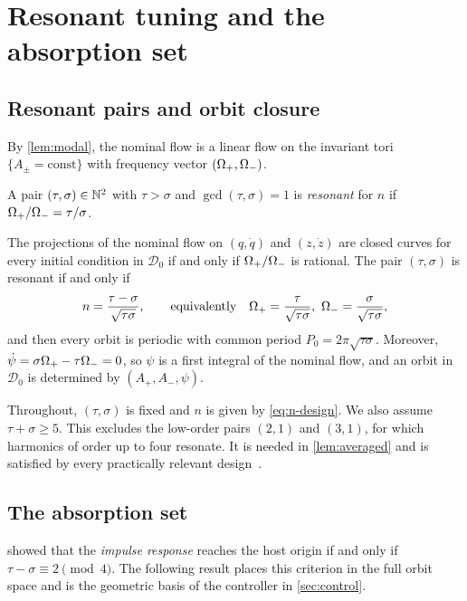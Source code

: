 \section{Resonant tuning and the absorption set}\label{sec:tuning}

\subsection{Resonant pairs and orbit closure}
By \cref{lem:modal}, the nominal flow is a linear flow on the invariant tori
$\{A_\pm=\mathrm{const}\}$ with frequency vector $(\Omega_+,\Omega_-)$.

\begin{definition}
A pair $(\tau,\sigma)\in\mathbb{N}^2$ with $\tau>\sigma$ and $\gcd(\tau,\sigma)=1$ is
\emph{resonant} for $n$ if $\Omega_+/\Omega_-=\tau/\sigma$.
\end{definition}

\begin{proposition}\label{prop:resonance}
The projections of the nominal flow on $(q,\dot q)$ and $(z,\dot z)$ are closed
curves for every initial condition in $\mathcal D_0$ if and only if $\Omega_+/\Omega_-$ is
rational.
The pair $(\tau,\sigma)$ is resonant if and only if
\begin{equation}\label{eq:n-design}
  n=\frac{\tau-\sigma}{\sqrt{\tau\sigma}},\qquad\text{equivalently}\quad
  \Op=\frac{\tau}{\sqrt{\tau\sigma}},\ \Om=\frac{\sigma}{\sqrt{\tau\sigma}},
\end{equation}
and then every orbit is periodic with common period $P_0=2\pi\sqrt{\tau\sigma}$.
Moreover, $\dot\psi=\sigma\Omega_+-\tau\Omega_-=0$, so $\psi$ is a first integral of the
nominal flow, and an orbit in $\mathcal D_0$ is determined by $(A_+,A_-,\psi)$.
\end{proposition}

Throughout, $(\tau,\sigma)$ is fixed and $n$ is given by \eqref{eq:n-design}.
We also assume $\tau+\sigma\ge5$.
This excludes the low-order pairs $(2,1)$ and $(3,1)$, for which harmonics of
order up to four resonate.
It is needed in \cref{lem:averaged} and is satisfied by every practically
relevant design~\citep[cf.][Sec.~V]{juchem2026shaping}.

\subsection{The absorption set}
\citet[Thm.~1]{juchem2026shaping} showed that the \emph{impulse response}
reaches the host origin if and only if $\tau-\sigma\equiv2\pmod4$.
The following result places this criterion in the full orbit space and is the
geometric basis of the controller in \cref{sec:control}.

